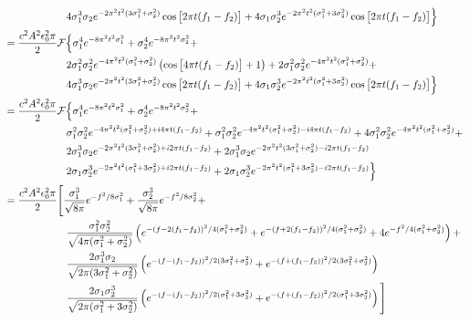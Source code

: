 \begin{align}
&\quad\quad\quad\quad\quad\quad  4\sigma_1^3\sigma_2 e^{-2\pi^2t^2(3\sigma_1^2+\sigma_2^2)}\cos\big[2\pi t (f_1-f_2)\big] + 4\sigma_1\sigma_2^3e^{-2\pi^2t^2(\sigma_1^2+3\sigma_2^2)}\cos\big[2\pi t (f_1-f_2)\big] \Big\}\notag\\
&= \frac{c^2A^2\epsilon_0^2 \pi}{2}\mathcal{F}\Big\{\sigma_1^4 e^{-8\pi^2t^2\sigma_1^2} + \sigma_2^4 e^{-8\pi^2t^2\sigma_2^2} + \notag\\
&\quad\quad\quad\quad\quad\quad2\sigma_1^2\sigma_2^2 e^{-4\pi^2t^2(\sigma_1^2+\sigma_2^2)}\left(\cos\big[4\pi t (f_1-f_2)\big]+1\right)  + 2\sigma_1^2\sigma_2^2 e^{-4\pi^2t^2(\sigma_1^2+\sigma_2^2)} +\notag\\
&\quad\quad\quad\quad\quad\quad  4\sigma_1^3\sigma_2 e^{-2\pi^2t^2(3\sigma_1^2+\sigma_2^2)}\cos\big[2\pi t (f_1-f_2)\big] + 4\sigma_1\sigma_2^3e^{-2\pi^2t^2(\sigma_1^2+3\sigma_2^2)}\cos\big[2\pi t (f_1-f_2)\big] \Big\}\notag\\
&= \frac{c^2A^2\epsilon_0^2 \pi}{2}\mathcal{F}\Big\{\sigma_1^4 e^{-8\pi^2t^2\sigma_1^2} + \sigma_2^4 e^{-8\pi^2t^2\sigma_2^2} + \notag\\
&\quad\quad\quad\quad\quad\quad\sigma_1^2\sigma_2^2 e^{-4\pi^2t^2(\sigma_1^2+\sigma_2^2)+i4\pi t (f_1-f_2)} + \sigma_1^2\sigma_2^2 e^{-4\pi^2t^2(\sigma_1^2+\sigma_2^2)-i4\pi t (f_1-f_2)} + 4\sigma_1^2\sigma_2^2 e^{-4\pi^2t^2(\sigma_1^2+\sigma_2^2)} +\notag\\
&\quad\quad\quad\quad\quad\quad  2\sigma_1^3\sigma_2 e^{-2\pi^2t^2(3\sigma_1^2+\sigma_2^2)+i2\pi t (f_1-f_2)} + 2\sigma_1^3\sigma_2 e^{-2\pi^2t^2(3\sigma_1^2+\sigma_2^2)-i2\pi t (f_1-f_2)}\notag\\
&\quad\quad\quad\quad\quad\quad 2\sigma_1\sigma_2^3e^{-2\pi^2t^2(\sigma_1^2+3\sigma_2^2)+i2\pi t (f_1-f_2)} + 2\sigma_1\sigma_2^3e^{-2\pi^2t^2(\sigma_1^2+3\sigma_2^2)-i2\pi t (f_1-f_2)}\Big\}\notag\\
&= \frac{c^2A^2\epsilon_0^2 \pi}{2}\Bigg[\frac{\sigma_1^3}{\sqrt{8\pi}} e^{-f^2/8\sigma_1^2} + \frac{\sigma_2^3}{\sqrt{8\pi}} e^{-f^2/8\sigma_2^2} + \notag\\
&\quad\quad\quad\quad\quad\quad \frac{\sigma_1^2\sigma_2^2}{\sqrt{4\pi(\sigma_1^2+\sigma_2^2)}}\left(e^{-(f-2(f_1-f_2))^2/4(\sigma_1^2+\sigma_2^2)} + e^{-(f+2(f_1-f_2))^2/4(\sigma_1^2+\sigma_2^2)}+4e^{-f^2/4(\sigma_1^2+\sigma_2^2)} \right) +\notag\\
&\quad\quad\quad\quad\quad\quad  \frac{2\sigma_1^3\sigma_2}{\sqrt{2\pi(3\sigma_1^2+\sigma_2^2)}}\left(e^{-(f-(f_1-f_2))^2/2(3\sigma_1^2+\sigma_2^2)}+e^{-(f+(f_1-f_2))^2/2(3\sigma_1^2+\sigma_2^2)}\right)\notag\\
&\quad\quad\quad\quad\quad\quad  \frac{2\sigma_1\sigma_2^3}{\sqrt{2\pi(\sigma_1^2+3\sigma_2^2)}}\left(e^{-(f-(f_1-f_2))^2/2(\sigma_1^2+3\sigma_2^2)}+e^{-(f+(f_1-f_2))^2/2(\sigma_1^2+3\sigma_2^2)}\right)\Bigg]
\end{align}

